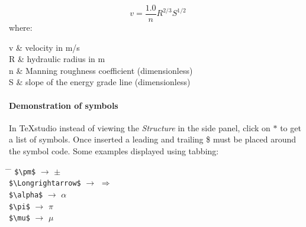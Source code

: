 \begin{minipage}{\columnwidth}%
	\begin{equation}\label{equ:Manning}
		v = \frac{1.0}{n} R^{2/3} S^{1/2}	
	\end{equation}
	where:
	\begin{conditions}
		v	&	velocity in m/s\\
		R	&	hydraulic radius in m\\
		n	&	Manning roughness coefficient (dimensionless)\\   
		S	&	slope of the energy grade line (dimensionless)
	\end{conditions}
\end{minipage}

\paragraph{Demonstration of symbols}
In TeXstudio instead of viewing the \textit{Structure} in the side panel, click on $\ast$ to get a list of symbols. Once inserted a leading and trailing \$ must be placed around the symbol code. Some examples displayed using tabbing:
\begin{tabbing}
	\hspace{2in}     			\= \hspace{0.40in}  \= \hspace{1in}    		\kill
	\verb!$\pm$! 				\> $\rightarrow$ 	\> $\pm$ 				\\
	\verb!$\Longrightarrow$! 	\> $\rightarrow$ 	\> $\Longrightarrow$ 	\\
	\verb!$\alpha$! 			\> $\rightarrow$ 	\> $\alpha$ 			\\
	\verb!$\pi$! 				\> $\rightarrow$ 	\> $\pi$ 				\\
	\verb!$\mu$! 				\> $\rightarrow$ 	\> $\mu$	 			\\
\end{tabbing}

